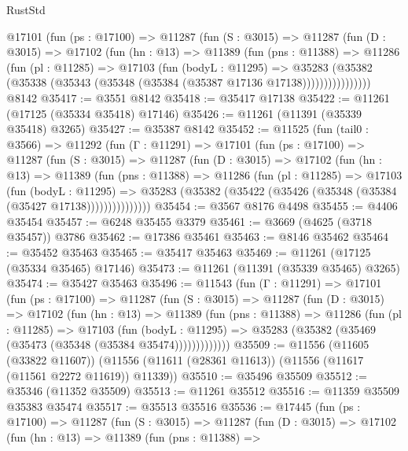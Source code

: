 \begin{lexlean}{RustStd}
\begin{coremodule}
        @17101
          (fun (ps : @17100) =>
          @11287
            (fun (S : @3015) =>
            @11287
              (fun (D : @3015) =>
              @17102
                (fun (hn : @13) =>
                @11389
                  (fun (pns : @11388) =>
                  @11286
                    (fun (pl : @11285) =>
                    @17103
                      (fun (bodyL : @11295) =>
                      @35283
                        (@35382
                          (@35338 (@35343 (@35348 (@35384 (@35387 @17136 @17138))))))))))))))))
    @8142
@35417 := @3551 @8142
@35418 := @35417 @17138
@35422 := @11261 (@17125 (@35334 @35418) @17146)
@35426 := @11261 (@11391 (@35339 @35418) @3265)
@35427 := @35387 @8142
@35452 := @11525
    (fun (tail0 : @3566) =>
    @11292
      (fun (Γ : @11291) =>
      @17101
        (fun (ps : @17100) =>
        @11287
          (fun (S : @3015) =>
          @11287
            (fun (D : @3015) =>
            @17102
              (fun (hn : @13) =>
              @11389
                (fun (pns : @11388) =>
                @11286
                  (fun (pl : @11285) =>
                  @17103
                    (fun (bodyL : @11295) =>
                    @35283 (@35382 (@35422 (@35426 (@35348 (@35384 (@35427 @17138)))))))))))))))
@35454 := @3567 @8176 @4498
@35455 := @4406 @35454
@35457 := @6248 @35455 @3379
@35461 := @3669 (@4625 (@3718 @35457)) @3786
@35462 := @17386 @35461
@35463 := @8146 @35462
@35464 := @35452 @35463
@35465 := @35417 @35463
@35469 := @11261 (@17125 (@35334 @35465) @17146)
@35473 := @11261 (@11391 (@35339 @35465) @3265)
@35474 := @35427 @35463
@35496 := @11543
    (fun (Γ : @11291) =>
    @17101
      (fun (ps : @17100) =>
      @11287
        (fun (S : @3015) =>
        @11287
          (fun (D : @3015) =>
          @17102
            (fun (hn : @13) =>
            @11389
              (fun (pns : @11388) =>
              @11286
                (fun (pl : @11285) =>
                @17103
                  (fun (bodyL : @11295) =>
                  @35283 (@35382 (@35469 (@35473 (@35348 (@35384 @35474)))))))))))))
@35509 := @11556
    (@11605 (@33822 @11607))
    (@11556 (@11611 (@28361 @11613)) (@11556 (@11617 (@11561 @2272 @11619)) @11339))
@35510 := @35496 @35509
@35512 := @35346 (@11352 @35509)
@35513 := @11261 @35512
@35516 := @11359 @35509 @35383 @35474
@35517 := @35513 @35516
@35536 := @17445
    (fun (ps : @17100) =>
    @11287
      (fun (S : @3015) =>
      @11287
        (fun (D : @3015) =>
        @17102
          (fun (hn : @13) =>
          @11389
            (fun (pns : @11388) =>

\end{coremodule}
\end{lexlean}
